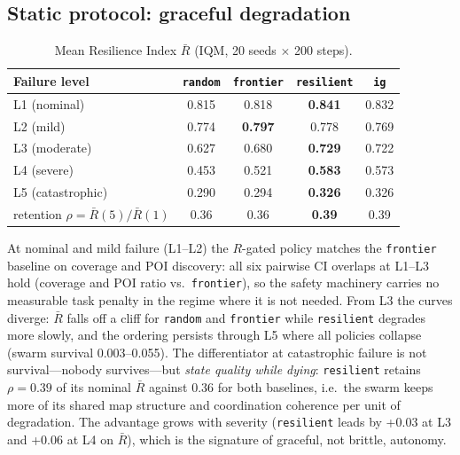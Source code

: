 \documentclass[12pt,a4paper]{article}
\begin{document}
\subsection{Static protocol: graceful degradation}

\begin{table}[h]
\centering
\caption{Mean Resilience Index $\bar R$ (IQM, 20 seeds $\times$ 200 steps).}
\label{tab:static-r}
\small
\begin{tabular}{lcccc}
\toprule
Failure level & \texttt{random} & \texttt{frontier} & \textbf{\texttt{resilient}} & \texttt{ig} \\
\midrule
L1 (nominal)       & 0.815 & 0.818 & \textbf{0.841} & 0.832 \\
L2 (mild)          & 0.774 & \textbf{0.797} & 0.778 & 0.769 \\
L3 (moderate)      & 0.627 & 0.680 & \textbf{0.729} & 0.722 \\
L4 (severe)        & 0.453 & 0.521 & \textbf{0.583} & 0.573 \\
L5 (catastrophic)  & 0.290 & 0.294 & \textbf{0.326} & 0.326 \\
\midrule
retention $\rho = \bar R(5)/\bar R(1)$ & 0.36 & 0.36 & \textbf{0.39} & 0.39 \\
\bottomrule
\end{tabular}
\end{table}

At nominal and mild failure (L1--L2) the $R$-gated policy matches the
\texttt{frontier} baseline on coverage and POI discovery: all six pairwise CI
overlaps at L1--L3 hold (coverage and POI ratio vs.~\texttt{frontier}), so the
safety machinery carries no measurable task penalty in the regime where it is
not needed. From L3 the curves diverge: $\bar R$ falls off a cliff for
\texttt{random} and \texttt{frontier} while \texttt{resilient} degrades
more slowly, and the ordering persists through L5 where all policies collapse
(swarm survival 0.003--0.055). The differentiator at catastrophic failure is
not survival---nobody survives---but \emph{state quality while dying}:
\texttt{resilient} retains $\rho = 0.39$ of its nominal $\bar R$ against 0.36
for both baselines, i.e.~the swarm keeps more of its shared map structure and
coordination coherence per unit of degradation. The advantage grows with
severity (\texttt{resilient} leads by +0.03 at L3 and +0.06 at L4 on $\bar R$),
which is the signature of graceful, not brittle, autonomy.
\end{document}
